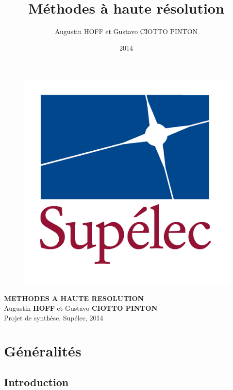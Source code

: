 \documentclass{article}
\title{Méthodes à haute résolution}
\author{Augustin HOFF et Gustavo CIOTTO PINTON}
\date{2014}
\begin{document}
\begin{titlepage}
\vspace*{.28\textheight}
\begin{center}
%
\begin{figure}[h]
    \centering
    \includegraphics[scale=0.12]{images/LogoSupelec}
\end{figure}
%
\vspace*{10pt}
\textbf{\LARGE METHODES A HAUTE RESOLUTION}\\[2 cm]
Augustin \textbf{HOFF} et Gustavo \textbf{CIOTTO PINTON}\\[1 cm]
Projet de synthèse, Supélec, 2014

\end{center}
\end{titlepage}

\newpage
\tableofcontents

\newpage

\section{Généralités}

\subsection{Introduction}
\end{document}
